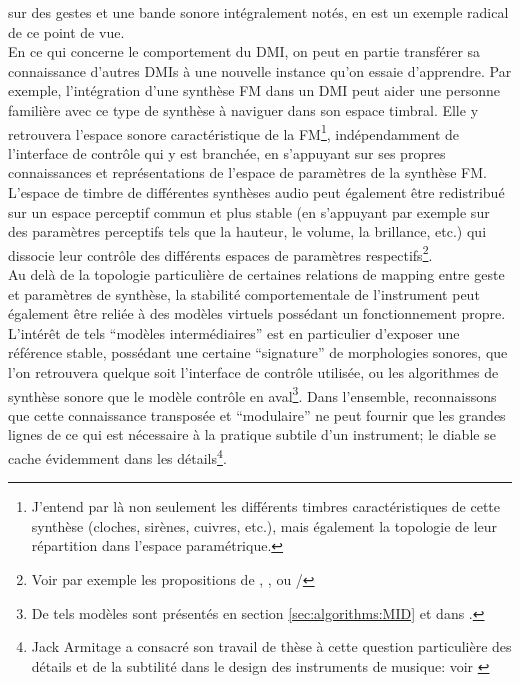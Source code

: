 sur des gestes et une bande sonore intégralement notés, en est un exemple radical de ce point de vue.\\
\indent En ce qui concerne le comportement du \gls{DMI}, on peut en partie transférer sa connaissance d'autres \glspl{DMI} à une nouvelle instance qu'on essaie d'apprendre. Par exemple, l'intégration d'une synthèse \gls{FM} dans un \gls{DMI} peut aider une personne familière avec ce type de synthèse à naviguer dans son espace timbral. Elle y retrouvera l'espace sonore caractéristique de la \gls{FM}\footnote{J'entend par là non seulement les différents timbres caractéristiques de cette synthèse (cloches, sirènes, cuivres, etc.), mais également la topologie de leur répartition dans l'espace paramétrique.}, indépendamment de l'interface de contrôle qui y est branchée, en s'appuyant sur ses propres connaissances et représentations de l'espace de paramètres de la synthèse \gls{FM}. L'espace de timbre de différentes synthèses audio peut également être redistribué sur un espace perceptif commun et plus stable (en s'appuyant par exemple sur des paramètres perceptifs tels que la hauteur, le volume, la brillance, etc.) qui dissocie leur contrôle des différents espaces de paramètres respectifs\footnote{Voir par exemple les propositions de \cite{wessel_timbre_1979}, \cite{arfib_strategies_2002}, \cite{schwarz_sound_2012} ou \cite{tubb_divergent_2014}/}.\\
\indent Au delà de la topologie particulière de certaines relations de mapping entre geste et paramètres de synthèse, la stabilité comportementale de l'instrument peut également être reliée à des modèles virtuels possédant un fonctionnement propre. L'intérêt de tels ``modèles intermédiaires'' est en particulier d'exposer une référence stable, possédant une certaine ``signature'' de morphologies sonores, que l'on retrouvera quelque soit l'interface de contrôle utilisée, ou les algorithmes de synthèse sonore que le modèle contrôle en aval\footnote{De tels modèles sont présentés en section \ref{sec:algorithms:MID} et dans \cite{goudard_dynamic_2011}.}. Dans l'ensemble, reconnaissons que cette connaissance transposée et ``modulaire'' ne peut fournir que les grandes lignes de ce qui est nécessaire à la pratique subtile d'un instrument; le diable se cache évidemment dans les détails\footnote{Jack Armitage a consacré son travail de thèse à cette question particulière des détails et de la subtilité dans le design des instruments de musique: voir \cite{armitage_subtlety_2022}}.


